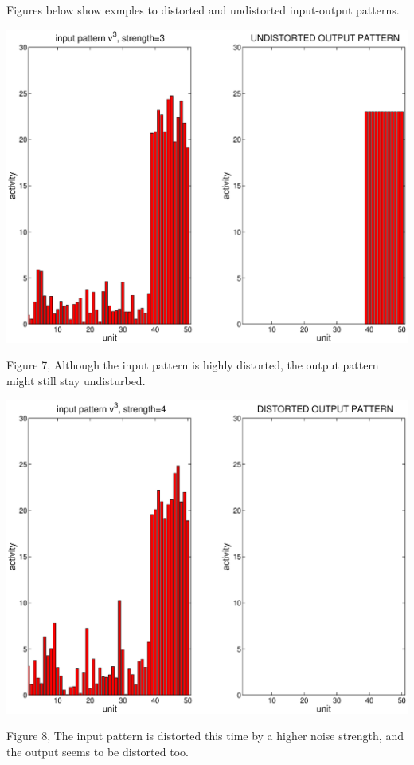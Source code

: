 \documentclass{article}
\begin{document}
Figures below show exmples to distorted and undistorted input-output patterns.

 \begin{center}
	\includegraphics[width=\textwidth]{undistorted.eps}
\begin{footnotesize}
 Figure 7, Although the input pattern is highly distorted, the output pattern might still stay undisturbed. \end{footnotesize}
\end{center}


 \begin{center}
	\includegraphics[width=\textwidth]{distorted.eps}
\begin{footnotesize}
 Figure 8, The input pattern is distorted this time by a higher noise strength, and the output seems to be distorted too. \end{footnotesize}
\end{center}
\end{document}
